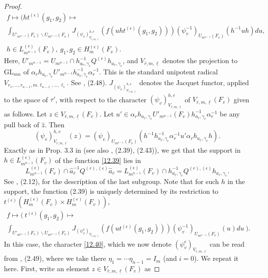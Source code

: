\documentclass[12pts]{amsart}
\newcommand{\GL}{{\mathrm{GL}}}
\begin{document}
\begin{proof}
\begin{multline}
f\mapsto  (ht^{(\epsilon)}(g_1,g_2)\mapsto\\
 \int_{U'_{m^{n-1}}(F_v)\backslash U_{m^{n-1}}(F_v)}J_{(\psi_v)^{h,e}_{V_{\bar{r},m,\underline{\ell}}}}(f(uht^{(\epsilon)}(g_1,g_2)))
(\psi^{-1}_v)_{U_{m^{n-1}}(F_v)}(h^{-1}uh)du,\\
h\in L^{(\epsilon)}_{m^{n-1}}(F_v),\ g_1,g_2\in H_m^{(\epsilon)}(F_v).
\end{multline}	
Here, $U'_{m^{n-1}}=U_{m^{n-1}}\cap h_{a_{\bar{r}},\gamma_e}^{-1}Q^{(r)}h_{a_{\bar{r}},\gamma_e}$, and $V_{\bar{r},m,\underline{\ell}}$ denotes the projection to $\GL_{mn}$ of $\alpha_rh_{a_{\bar{r}},\gamma_e}U'_{m^{n-1}}h_{a_{\bar{r}},\gamma_e}^{-1}\alpha_r^{-1}$. This is the standard unipotent radical\\ $V_{r_1,...,r_{n-1},m.\ell_{n-1},...,\ell_1}$. See \cite{GS18}, (2.48). $J_{(\psi_v)^{h,e}_{V_{\bar{r},m,\underline{\ell}}}}$ denotes the Jacquet functor, applied to the space of $\tau'$, with respect to the character $(\psi_v)^{h,e}_{V_{\bar{r},m,\underline{\ell}}}$ of $V_{\bar{r},m,\underline{\ell}}(F_v)$ given as follows. Let $z\in V_{\bar{r},m,\underline{\ell}}(F_v)$. Let $u'\in \alpha_rh_{a_{\bar{r}},\gamma_e}U'_{m^{n-1}}(F_v)h_{a_{\bar{r}},\gamma_e}^{-1}\alpha_r^{-1}$	be any pull back of $\hat{z}$. Then
\begin{equation}\label{12.40}
(\psi_v)^{h,e}_{V_{\bar{r},m,\underline{\ell}}}(z)=(\psi_v)_{U_{m^{n-1}}(F_v)}(h^{-1}h_{a_{\bar{r}},\gamma_e}^{-1}\alpha_r^{-1}u'\alpha_rh_{a_{\bar{r}},\gamma_e}h).
\end{equation}
Exactly as in Prop. 3.3 in \cite{GJS15} (see also \cite{GS18}, (2.39), (2.43)), we get that the support in $h\in L^{(\epsilon)}_{m^{n-1}}(F_v)$ of the function \eqref{12.39} lies in 
$$
L^{(\epsilon)}_{m^{n-1}}(F_v)\cap \hat{a}_{\bar{r}}^{-1}Q^{(r),(\epsilon)}\hat{a}_{\bar{r}}=L^{(\epsilon)}_{m^{n-1}}(F_v)\cap h_{a_{\bar{r}},\gamma_e}^{-1}Q^{(r),(\epsilon)}h_{a_{\bar{r}},\gamma_e}.
$$	
See \cite{GS18}, (2.12), for the description of the last subgroup. Note that for such $h$ in the support, the function (2.39) is uniquely determined by its restriction to $t^{(\epsilon)}(H^{(\epsilon)}_m(F_v)\times H^{(\epsilon)}_m(F_v))$,
\begin{multline}\label{12.41}
f\mapsto  (\ t^{(\epsilon)}(g_1,g_2)\mapsto \\
\int_{U'_{m^{n-1}}(F_v)\backslash U_{m^{n-1}}(F_v)}J_{(\psi^e_v)_{V_{\bar{r},m,\underline{\ell}}}}(f(ut^{(\epsilon)}(g_1,g_2)))
(\psi^{-1}_v)_{U_{m^{n-1}}(F_v)}(u)du \ ).
\end{multline}
In this case, the character \eqref{12.40}, which we now denote $(\psi^e_v)_{V_{\bar{r},m,\underline{\ell}}}$ can be read from \cite{GS18}, (2.49), where we take there $\eta_1=\cdots \eta_{n-1}=I_m$ (and $i=0$). We repeat it here. First, write an element $z\in V_{\bar{r},m,\underline{\ell}}(F_v)$ as

\end{proof}
\end{document}
